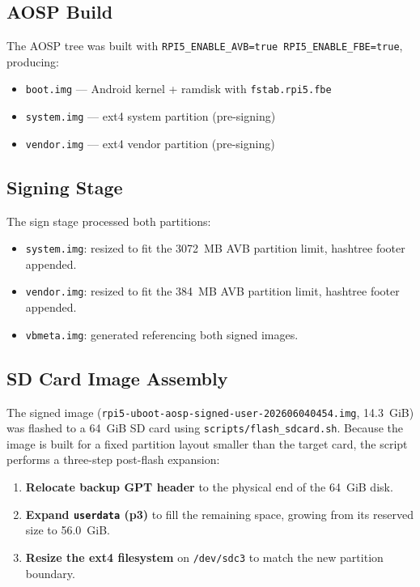 \subsection{AOSP Build}

The AOSP tree was built with \texttt{RPI5\_ENABLE\_AVB=true RPI5\_ENABLE\_FBE=true}, producing:

\begin{itemize}
    \item \texttt{boot.img} --- Android kernel + ramdisk with \texttt{fstab.rpi5.fbe}
    \item \texttt{system.img} --- ext4 system partition (pre-signing)
    \item \texttt{vendor.img} --- ext4 vendor partition (pre-signing)
\end{itemize}

\subsection{Signing Stage}

The sign stage processed both partitions:

\begin{itemize}
    \item \texttt{system.img}: resized to fit the 3072~MB AVB partition limit, hashtree footer appended.
    \item \texttt{vendor.img}: resized to fit the 384~MB AVB partition limit, hashtree footer appended.
    \item \texttt{vbmeta.img}: generated referencing both signed images.
\end{itemize}

\subsection{SD Card Image Assembly}

The signed image (\texttt{rpi5-uboot-aosp-signed-user-202606040454.img}, 14.3~GiB) was flashed to a 64~GiB SD card using \texttt{scripts/flash\_sdcard.sh}. Because the image is built for a fixed partition layout smaller than the target card, the script performs a three-step post-flash expansion:

\begin{enumerate}
    \item \textbf{Relocate backup GPT header} to the physical end of the 64~GiB disk.
    \item \textbf{Expand \texttt{userdata} (p3)} to fill the remaining space, growing from its reserved size to 56.0~GiB.
    \item \textbf{Resize the ext4 filesystem} on \texttt{/dev/sdc3} to match the new partition boundary.
\end{enumerate}

